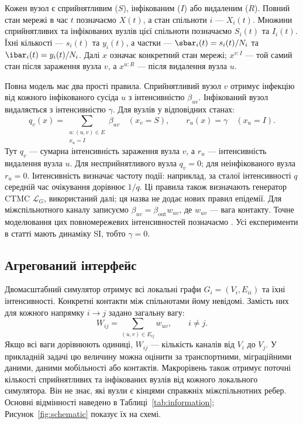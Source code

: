 Кожен вузол є сприйнятливим ($S$), інфікованим ($I$) або видаленим ($R$). Повний стан мережі в час $t$ позначаємо $X(t)$, а стан спільноти $i$ --- $X_i(t)$. Множини сприйнятливих та інфікованих вузлів цієї спільноти позначаємо $S_i(t)$ та $I_i(t)$. Їхні кількості --- $s_i(t)$ та $y_i(t)$, а частки --- $\sbar_i(t)=s_i(t)/N_i$ та $\ibar_i(t)=y_i(t)/N_i$. Далі $x$ означає конкретний стан мережі; $x^{v:I}$ --- той самий стан після зараження вузла $v$, а $x^{u:R}$ --- після видалення вузла $u$.

Повна модель має два прості правила. Сприйнятливий вузол $v$ отримує інфекцію від кожного інфікованого сусіда $u$ з інтенсивністю $\beta_{uv}$. Інфікований вузол видаляється з інтенсивністю $\gamma$. Для вузлів у відповідних станах:
\begin{equation}
\label{eq:full_generator}
q_v(x)=\sum_{\substack{u:(u,v)\in E\\x_u=I}}\beta_{uv}
\quad (x_v=S),
\qquad r_u(x)=\gamma\quad (x_u=I).
\end{equation}
Тут $q_v$ --- сумарна інтенсивність зараження вузла $v$, а $r_u$ --- інтенсивність видалення вузла $u$. Для несприйнятливого вузла $q_v=0$; для неінфікованого вузла $r_u=0$. Інтенсивність визначає частоту події: наприклад, за сталої інтенсивності $q$ середній час очікування дорівнює $1/q$. Ці правила також визначають генератор CTMC $\mathcal{L}_G$, використаний далі; ця назва не додає нових правил епідемії. Для міжспільнотного каналу записуємо $\beta_{uv}=\beta_{\mathrm{out}}w_{uv}$, де $w_{uv}$ --- вага контакту. Точне моделювання цих повномережевих інтенсивностей позначаємо \Full{}. Усі експерименти в статті мають динаміку SI, тобто $\gamma=0$.

\subsection{Агрегований інтерфейс}
\label{sec:interface}

Двомасштабний симулятор \TS{} отримує всі локальні графи $G_i=(V_i,E_{ii})$ та їхні інтенсивності. Конкретні контакти між спільнотами йому невідомі. Замість них для кожного напрямку $i\to j$ задано загальну вагу:
\begin{equation}
\label{eq:weight}
W_{ij}=\sum_{(u,v)\in E_{ij}}w_{uv},\qquad i\neq j.
\end{equation}
Якщо всі ваги дорівнюють одиниці, $W_{ij}$ --- кількість каналів від $V_i$ до $V_j$. У прикладній задачі цю величину можна оцінити за транспортними, міграційними даними, даними мобільності або контактів. Макрорівень також отримує поточні кількості сприйнятливих та інфікованих вузлів від кожного локального симулятора. Він не знає, які вузли є кінцями справжніх міжспільнотних ребер. Основні відмінності наведено в Таблиці~\ref{tab:information}; Рисунок~\ref{fig:schematic} показує їх на схемі.

